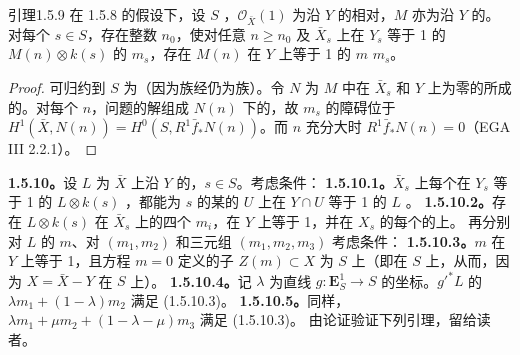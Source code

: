 \begin{SGAresult}{引理}{1.5.9}
在 1.5.8 的假设下，设 $S$ ，$\mathcal O_{\bar X}(1)$ 为沿 $Y$ 的相对，$M$ 亦为沿 $Y$ 的。对每个 $s\in S$，存在整数 $n_0$，使对任意 $n\ge n_0$ 及 $\bar X_s$ 上在 $Y_s$ 等于 1 的 $M(n)\otimes k(s)$ 的 $m_s$，存在 $M(n)$ 在 $Y$ 上等于 1 的 $m$  $m_s$。
\end{SGAresult}
\begin{proof}
可归约到 $S$ 为（因为族经仍为族）。令 $N$ 为 $M$ 中在 $\bar X_s$ 和 $Y$ 上为零的所成的。对每个 $n$，问题的解组成 $N(n)$ 下的，故 $m_s$ 的障碍位于 $H^1(\bar X,N(n))=H^0(S,R^1\bar f_*N(n))$。而 $n$ 充分大时 $R^1\bar f_*N(n)=0$（EGA III 2.2.1）。
\end{proof}
\textbf{1.5.10。}设 $L$ 为 $\bar X$ 上沿 $Y$ 的，$s\in S$。考虑条件：
\textbf{1.5.10.1。}$\bar X_s$ 上每个在 $Y_s$ 等于 1 的 $L\otimes k(s)$ ，都能为 $s$ 的某的 $U$ 上在 $Y\cap U$ 等于 1 的 $L$ 。
\textbf{1.5.10.2。}存在 $L\otimes k(s)$ 在 $\bar X_s$ 上的四个 $m_i$，在 $Y$ 上等于 1，并在 $X_s$ 的每个的上。
再分别对 $L$ 的 $m$、对 $(m_1,m_2)$ 和三元组 $(m_1,m_2,m_3)$ 考虑条件：
\textbf{1.5.10.3。}$m$ 在 $Y$ 上等于 1，且方程 $m=0$ 定义的子 $Z(m)\subset X$ 为 $S$ 上（即在 $S$ 上，从而，因为 $X=\bar X-Y$ 在 $S$ 上）。
\textbf{1.5.10.4。}记 $\lambda$ 为直线 $g:\mathbf E^1_S\to S$ 的坐标。$g'^*L$ 的 $\lambda m_1+(1-\lambda)m_2$ 满足 (1.5.10.3)。
\textbf{1.5.10.5。}同样，$\lambda m_1+\mu m_2+(1-\lambda-\mu)m_3$ 满足 (1.5.10.3)。
由论证验证下列引理，留给读者。
